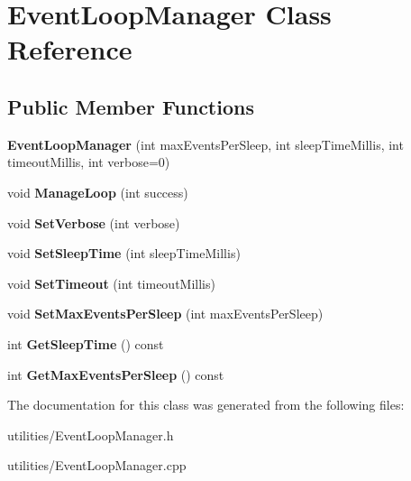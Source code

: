 \hypertarget{classEventLoopManager}{\section{Event\-Loop\-Manager Class Reference}
\label{classEventLoopManager}
}
\subsection*{Public Member Functions}
\begin{DoxyCompactItemize}
\item 
\hypertarget{classEventLoopManager_a5797b484776fc90d7576e8e72f82fc80}{{\bfseries Event\-Loop\-Manager} (int max\-Events\-Per\-Sleep, int sleep\-Time\-Millis, int timeout\-Millis, int verbose=0)}\label{classEventLoopManager_a5797b484776fc90d7576e8e72f82fc80}

\item 
\hypertarget{classEventLoopManager_abde1b1a7f6f8000792e8d3d869a2a9bc}{void {\bfseries Manage\-Loop} (int success)}\label{classEventLoopManager_abde1b1a7f6f8000792e8d3d869a2a9bc}

\item 
\hypertarget{classEventLoopManager_a16625f41f0827bca9c430c06256fe9d4}{void {\bfseries Set\-Verbose} (int verbose)}\label{classEventLoopManager_a16625f41f0827bca9c430c06256fe9d4}

\item 
\hypertarget{classEventLoopManager_a2db4f1e24f015b05ccaaa46a1afb6467}{void {\bfseries Set\-Sleep\-Time} (int sleep\-Time\-Millis)}\label{classEventLoopManager_a2db4f1e24f015b05ccaaa46a1afb6467}

\item 
\hypertarget{classEventLoopManager_ad03106388e342a0cfc70234aa04aa05a}{void {\bfseries Set\-Timeout} (int timeout\-Millis)}\label{classEventLoopManager_ad03106388e342a0cfc70234aa04aa05a}

\item 
\hypertarget{classEventLoopManager_aa50d2832448e9b0d16ce28961769f747}{void {\bfseries Set\-Max\-Events\-Per\-Sleep} (int max\-Events\-Per\-Sleep)}\label{classEventLoopManager_aa50d2832448e9b0d16ce28961769f747}

\item 
\hypertarget{classEventLoopManager_a44fd8d9e0ed8cc5df7d3f119f8faa0e4}{int {\bfseries Get\-Sleep\-Time} () const }\label{classEventLoopManager_a44fd8d9e0ed8cc5df7d3f119f8faa0e4}

\item 
\hypertarget{classEventLoopManager_a12bd059953d8d10ac0138080eb550afa}{int {\bfseries Get\-Max\-Events\-Per\-Sleep} () const }\label{classEventLoopManager_a12bd059953d8d10ac0138080eb550afa}

\end{DoxyCompactItemize}


The documentation for this class was generated from the following files\-:\begin{DoxyCompactItemize}
\item 
utilities/Event\-Loop\-Manager.\-h\item 
utilities/Event\-Loop\-Manager.\-cpp\end{DoxyCompactItemize}
